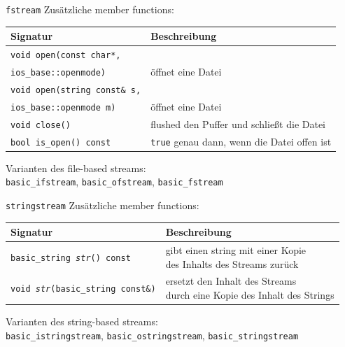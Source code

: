\begin{frame}{\texttt{fstream}}
	Zusätzliche member functions:
	\vspace{1em}
	
	\footnotesize
	
	\begin{tabular}{ll}
		\textbf{Signatur}	&	\textbf{Beschreibung}	\\
		\hline
		
		\texttt{void open(const char*,}\\
			\hspace{2em} \texttt{ios\_base::openmode)}	\vspace{0.5em}	&	öffnet eine Datei	\\
			
		\texttt{void open(string const\& s,}\\
			\hspace{2em} \texttt{ios\_base::openmode m)}	\vspace{0.5em}	&	öffnet eine Datei	\\
			
		\texttt{void close()}	&	flushed den Puffer und schließt die Datei	\\
		
		\vspace{0.5em}
		\texttt{bool is\_open() const}	&	\texttt{true} genau dann, wenn die Datei offen ist	\\
	\end{tabular}
	
	\vspace{2em}
	
	Varianten des file-based streams:	\\
	\texttt{basic\_ifstream}, \texttt{basic\_ofstream}, \texttt{basic\_fstream}
\end{frame}

\begin{frame}{\texttt{stringstream}}
	Zusätzliche member functions:
	\vspace{1em}
	
	\footnotesize
	
	\begin{tabular}{ll}
		\textbf{Signatur}	&	\textbf{Beschreibung}	\\
		\hline
		\texttt{basic\_string \emph{str}() const}	&	\parbox{20em}{\vspace{0.5em} gibt einen string mit einer Kopie\\ des Inhalts des Streams zurück}	\vspace{1em} \\
		\texttt{void \emph{str}(basic\_string const\&)}	&	\parbox{20em}{ersetzt den Inhalt des Streams\\ durch eine Kopie des Inhalt des Strings}	\\
	\end{tabular}
	
	\vspace{2em}
	
	Varianten des string-based streams:	\\
	\texttt{basic\_istringstream}, \texttt{basic\_ostringstream}, \texttt{basic\_stringstream}
\end{frame}


